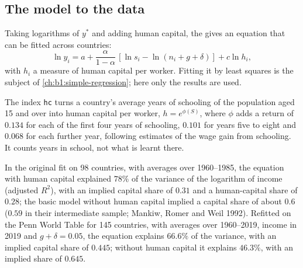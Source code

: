 \subsection*{The model to the data}

Taking logarithms of $y^*$ and adding human capital, the  gives
an equation that can be fitted across countries:
\[
\ln y_i = a + \frac{\alpha}{1 - \alpha}\,[\ln s_i - \ln(n_i + g + \delta)] + c \ln h_i,
\]
with $h_i$ a measure of human capital per worker. Fitting it by least squares
is the subject of \cref{ch:b1:simple-regression}; here only the results are
used.

\begin{measure}
The index \texttt{hc} turns a country's average years of schooling of the
population aged 15 and over into human capital per worker, $h = e^{\phi(S)}$,
where $\phi$ adds a return of $0.134$ for each of the first four years of
schooling, $0.101$ for years five to eight and $0.068$ for each further year,
following estimates of the wage gain from schooling. %
It counts years in school, not what is learnt there.
\end{measure}

In the original fit on 98 countries, with averages over 1960--1985, the
equation with human capital explained $78\%$ of the variance of the
logarithm of income (adjusted $R^2$), with an implied capital share of $0.31$
and a human-capital share of $0.28$; the basic model without human capital
implied a capital share of about $0.6$ ($0.59$ in their intermediate sample;
Mankiw, Romer and Weil 1992).
Refitted on the Penn World Table for 145 countries, with averages over
1960--2019, income in 2019 and $g + \delta = 0.05$, the equation explains $66.6\%$ of the
variance, with an implied capital share of $0.445$; without human capital it
explains $46.3\%$, with an implied share of $0.645$. %

